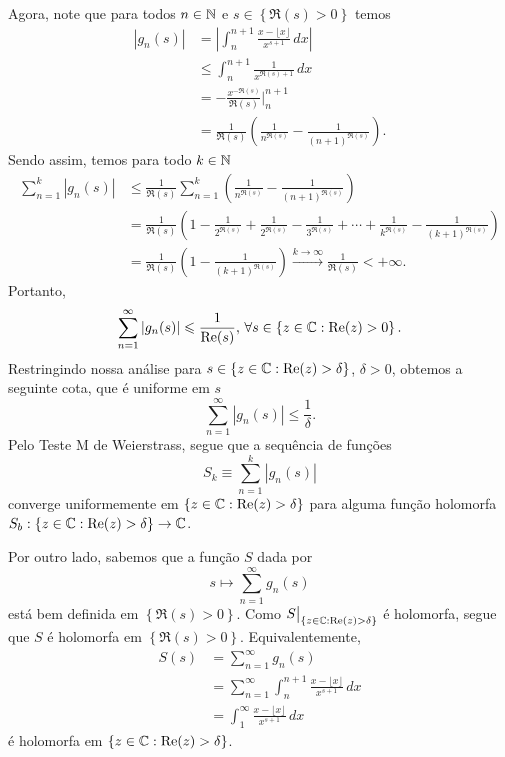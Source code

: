 \begin{exemplo}
\bigskip 



Agora, note que para todos $n\in\mathbb{N}$ e $s\in\left\{ \Re(s) > 0 \right\}$ temos
%
\begin{align*}
    |g_n(s)| &= \left| \int_n^{n+1} \frac{x - \lfloor x \rfloor}{x^{s+1}} \, dx \right| \\
             &\leq \int_n^{n+1} \frac{1}{x^{\Re(s) + 1}} \, dx \\
             &= -\frac{x^{-\Re(s)}}{\Re(s)}\Bigg|_n^{n+1} \\
             &= \frac{1}{\Re(s)}\left( \frac{1}{n^{\Re(s)}} - \frac{1}{(n+1)^{\Re(s)}} \right).
\end{align*}
%
Sendo assim, temos para todo $k\in\mathbb{N}$
%
\begin{align*}
    \sum_{n=1}^k |g_n(s)| 
    &\leq \frac{1}{\Re(s)}\sum_{n=1}^k\left( \frac{1}{n^{\Re(s)}} - \frac{1}{(n+1)^{\Re(s)}} \right) \\
    &= \frac{1}{\Re(s)} 
    \left( 1 - \frac{1}{2^{\Re(s)}} 
    + \frac{1}{2^{\Re(s)}} - \frac{1}{3^{\Re(s)}} 
    + \cdots +
    \frac{1}{k^{\Re(s)}} - \frac{1}{(k+1)^{\Re(s)}} \right) \\
    &= \frac{1}{\Re(s)} \left( 1 - \frac{1}{(k+1)^{\Re(s)}} \right) 
    \xrightarrow{k\to\infty} \frac{1}{\Re(s)} < +\infty.
\end{align*}
%
Portanto,
%
\[
\sum_{n=1}^{\infty} |g_n(s)| \leqslant \frac{1}{\mathrm{Re}(s)}, \, 
\forall s\in\left\{ z\in\mathbb{C} : \mathrm{Re}(z) > 0 \right\}.
\]
%
Restringindo nossa análise para $s\in\left\{ z\in\mathbb{C} : \mathrm{Re}(z) > \delta \right\}$, $\delta > 0$,
obtemos a seguinte cota, que é uniforme em $s$
%
\[
\sum_{n=1}^{\infty} |g_n(s)| \leq \frac{1}{\delta}.
\]
%
Pelo Teste M de Weierstrass, segue que a sequência de funções
%
\[
S_k \equiv \sum_{n=1}^{k} |g_n(s)|
\]
%
converge uniformemente em $\left\{ z\in\mathbb{C} : \mathrm{Re}(z) > \delta \right\}$ para alguma função
holomorfa $S_b: \left\{ z\in\mathbb{C} : \mathrm{Re}(z) > \delta \right\} \to \mathbb{C}$.

Por outro lado, sabemos que a função $S$ dada por
%
\[
s \mapsto \sum_{n=1}^{\infty} g_n(s)
\]
%
está bem definida em $\left\{\Re(s) > 0 \right\}$. Como 
$S\big|_{\left\{ z\in\mathbb{C} : \mathrm{Re}(z) > \delta \right\}}$ é holomorfa, segue que $S$ é holomorfa em
$\left\{\Re(s) > 0 \right\}$. Equivalentemente,
%
\begin{align*}
    S(s) &= \sum_{n=1}^{\infty} g_n(s) \\
         &= \sum_{n=1}^{\infty} \int_n^{n+1} \frac{x - \lfloor x \rfloor}{x^{s+1}} \, dx \\
         &= \int_1^{\infty} \frac{x - \lfloor x \rfloor}{x^{s+1}} \, dx
\end{align*}
%
é holomorfa em $\left\{ z\in\mathbb{C} : \mathrm{Re}(z) > \delta \right\}$.
\end{exemplo}
%